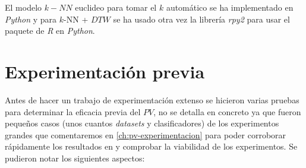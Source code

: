 El modelo $k-NN$ euclideo para tomar el $k$ automático se ha implementado en \emph{Python} y para $k$-NN + $DTW$ se ha usado otra vez la librería \emph{rpy2} para usar el paquete de \emph{R} en \emph{Python}.

\section{Experimentación previa}

Antes de hacer un trabajo de experimentación extenso se hicieron varias pruebas para determinar la eficacia previa del $PV$, no se detalla en concreto ya que fueron pequeños casos (unos cuantos \emph{datasets} y clasificadores) de los experimentos grandes que comentaremos en \autoref{ch:pv-experimentacion} para poder corroborar rápidamente los resultados en \cite{zhang2019perturbation} y comprobar la viabilidad de los experimentos. Se pudieron notar los siguientes aspectos:

